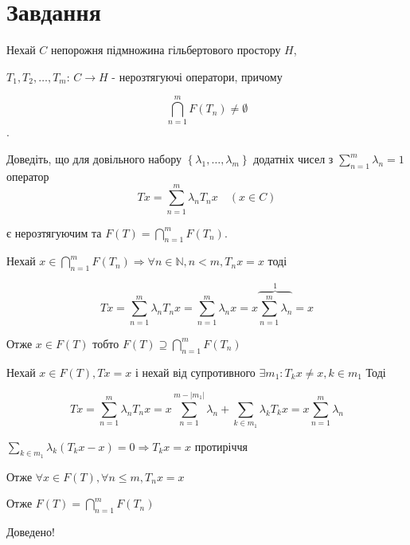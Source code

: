 
\chapter{Завдання \theHchapter}

\begin{tcolorbox}[title=Завдання]
    Нехай $C$ непорожня підмножина гільбертового простору $H$, 


    $T_{1}, T_{2}, \ldots, T_{m}$: $C \rightarrow H$ - 
    нерозтягуючі оператори, причому 


    $$\bigcap\limits_{n=1}^{m} F\left(T_{n}\right) \neq \emptyset$$. 
    
    
    Доведіть, що для довільного набору 
    $\left\{\lambda_{1}, \ldots, \lambda_{m}\right\}$ 
    додатніх чисел з $ \sum\limits_{n=1}^{m} \lambda_{n}=1$ оператор
    $$T x=\sum_{n=1}^{m} \lambda_{n} T_{n} x \quad(x \in C)$$

    є нерозтягуючим та $F(T)=\bigcap\limits_{n=1}^{m} F\left(T_{n}\right)$.

\end{tcolorbox}



Нехай $x \in \bigcap\limits_{n = 1}^{m}F(T_n) \Rightarrow 
\forall n \in \mathbb{N}, n < m, T_nx = x$ тоді 


$$Tx = \sum\limits_{n=1}^{m} \lambda_nT_nx = \sum\limits_{n=1}^{m}\lambda_nx = 
x \overbrace{\sum\limits_{n=1}^{m}\lambda_n}^{\mbox{1}} = x$$

Отже $x \in F(T)$ тобто $F(T)\supseteq\bigcap\limits_{n=1}^{m} F(T_{n})$


Нехай $x \in F(T), Tx = x$ і нехай від супротивного $\exists m_1: T_{k}x \neq x, 
k \in m_1$ Тоді 


$$Tx = \sum_{n = 1}^{m}\lambda_nT_nx = x\sum_{n = 1}^{m - |m_1|}\lambda_n + 
\sum_{k \in m_1}\lambda_k T_kx = x\sum_{n=1}^{m}\lambda_n$$


$\sum\limits_{k\in m_1} \lambda_k (T_kx - x) = 0 \Rightarrow T_kx = x$
протиріччя


Отже $\forall x \in F(T), \forall n \le m, T_nx = x$


Отже $F(T) = \bigcap\limits_{n=1}^{m} F(T_{n})$


Доведено!